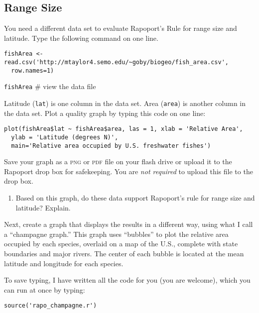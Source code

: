 \documentclass[11pt]{article}
\begin{document}
\subsection*{Range Size}

You need a different data set to evaluate Rapoport's Rule for range 
size and latitude. Type the following command on one line.

\begin{verbatim}
fishArea <- read.csv('http://mtaylor4.semo.edu/~goby/biogeo/fish_area.csv',
  row.names=1)
\end{verbatim}

\texttt{fishArea} \qquad \# view the data file

Latitude (\texttt{lat}) is one column in the data set. Area
(\texttt{area}) is another column in the data set. Plot a quality
graph by typing this code on one line:

\begin{verbatim}
plot(fishArea$lat ~ fishArea$area, las = 1, xlab = 'Relative Area',
  ylab = 'Latitude (degrees N)',
  main='Relative area occupied by U.S. freshwater fishes')
\end{verbatim}

Save your graph as a \textsc{png} or \textsc{pdf} file on your flash 
drive or upload it to the Rapoport drop box for safekeeping. You are 
\emph{not required} to upload this file to the drop box.

\begin{enumerate}[resume]
	\item Based on this graph, do these data support Rapoport's rule 
	for range size and latitude? Explain.

	\vspace{8\baselineskip}

\end{enumerate}

Next, create a graph that displays the results in a different way, 
using what I call a “champagne graph.” This graph uses ``bubbles'' to 
plot the relative area occupied by each species, overlaid on a map of 
the U.S., complete with state boundaries and major rivers.  The center 
of each bubble is located at the mean latitude and longitude for each 
species.

To save typing, I have written all the code for you (you are welcome), 
which you can run at once by typing:

\begin{verbatim}
source('rapo_champagne.r')
\end{verbatim}
\end{document}
